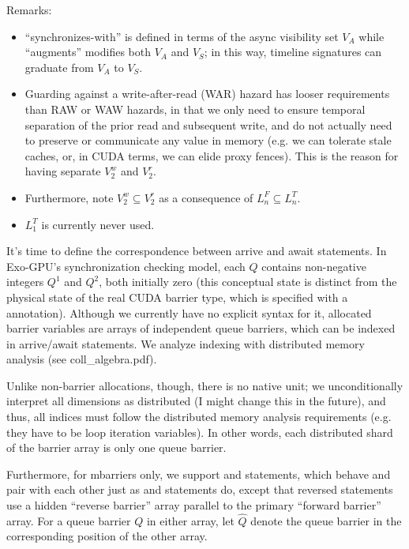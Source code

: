 Remarks:
\begin{itemize}
  \item ``synchronizes-with'' is defined in terms of the async visibility set $V_A$ while ``augments'' modifies both $V_A$ and $V_S$; in this way, timeline signatures can graduate from $V_A$ to $V_S$.
  \item Guarding against a write-after-read (WAR) hazard has looser requirements than RAW or WAW hazards, in that we only need to ensure temporal separation of the prior read and subsequent write, and do not actually need to preserve or communicate any value in memory (e.g. we can tolerate stale caches, or, in CUDA terms, we can elide proxy fences).
  This is the reason for having separate $V_2^w$ and $V_2^r$.
  \item Furthermore, note $V_2^w \subseteq V_2^r$ as a consequence of $L_n^F \subseteq L_n^T$.
  \item $L_1^T$ is currently never used.
\end{itemize}

\filbreak
{}

It's time to define the correspondence between arrive and await statements.
In Exo-GPU's synchronization checking model, each  $Q$ contains non-negative integers  $Q^1$ and  $Q^2$, both initially zero (this conceptual state is distinct from the physical state of the real CUDA barrier type, which is specified with a  annotation).
Although we currently have no explicit syntax for it, allocated barrier variables are arrays of independent queue barriers, which can be indexed in arrive/await statements.
We analyze indexing with distributed memory analysis (see coll\_algebra.pdf).



\filbreak
Unlike non-barrier allocations, though, there is no native unit; we unconditionally interpret all dimensions as distributed (I might change this in the future), and thus, all indices must follow the distributed memory analysis requirements (e.g. they have to be  loop iteration variables).
In other words, each distributed shard of the barrier array is only one queue barrier.

\filbreak
Furthermore, for mbarriers only, we support  and  statements, which behave and pair with each other just as  and  statements do, except that reversed statements use a hidden ``reverse barrier'' array parallel to the primary ``forward barrier'' array.
For a queue barrier $Q$ in either array, let $\widehat{Q}$ denote the queue barrier in the corresponding position of the other array.

